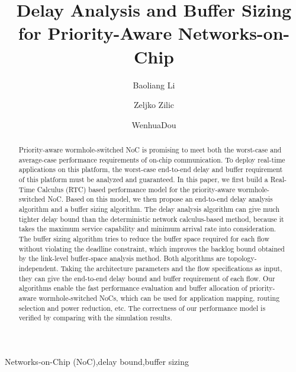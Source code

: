 \documentclass[preprint]{elsarticle}
\begin{document}
\begin{frontmatter}

\title{Delay Analysis and Buffer Sizing for Priority-Aware Networks-on-Chip}

\author[nudt]{Baoliang Li}
\author[mcgill]{Zeljko Zilic}
\author[nudt]{WenhuaDou}
\address[nudt]{College of Computer, National University of Defense Technology, Changsha 410073, P.R. China}
\address[mcgill]{Department of Electrical $\&$ Computer Engineering, McGill University, Montreal H3A-2A7, Quebec, Canada}

\begin{abstract}
Priority-aware wormhole-switched NoC is promising to meet both the worst-case and average-case performance requirements of on-chip communication. To deploy real-time applications on this platform, the worst-case end-to-end delay and buffer requirement of this platform must be analyzed and guaranteed. In this paper, we first build a Real-Time Calculus (RTC) based performance model for the priority-aware wormhole-switched NoC. Based on this model, we then propose an end-to-end delay analysis algorithm and a buffer sizing algorithm. The delay analysis algorithm can give much tighter delay bound than the deterministic network calculus-based method, because it takes the maximum service capability and minimum arrival rate into consideration. The buffer sizing algorithm tries to reduce the buffer space required for each flow without violating the deadline constraint, which improves the backlog bound obtained by the link-level buffer-space analysis method. Both algorithms are topology-independent. Taking the architecture parameters and the flow specifications as input, they can give the end-to-end delay bound and buffer requirement of each flow. Our algorithms enable the fast performance evaluation and buffer allocation of priority-aware wormhole-switched NoCs, which can be used for application mapping, routing selection and power reduction, etc. The correctness of our performance model is verified by comparing with the simulation results.
\end{abstract}

\begin{keyword}
Networks-on-Chip (NoC)\sep delay bound\sep buffer sizing
\end{keyword}

\end{frontmatter}
\end{document}
